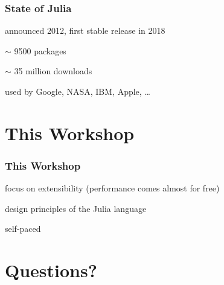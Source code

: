 \documentclass[notes]{beamer}
\newenvironment{wideitemize}{
    \itemize\addtolength{\itemsep}{15pt}\addtolength{\topsep}{10pt}}{\enditemize}
\begin{document}
    \begin{frame}
        \frametitle{State of Julia}
        \begin{wideitemize}
            \item announced 2012, first stable release in 2018
            \item $\sim$ 9500 packages
            \item $\sim$ 35 million downloads
            \item used by Google, NASA, IBM, Apple, \ldots
        \end{wideitemize}
    \end{frame}

	\section{This Workshop}

    \begin{frame}
        \frametitle{This Workshop}
        \begin{wideitemize}
            \item focus on extensibility (performance comes almost for free)
            \item design principles of the Julia language
            \item self-paced
        \end{wideitemize}
    \end{frame}

    \section{Questions?}
\end{document}

